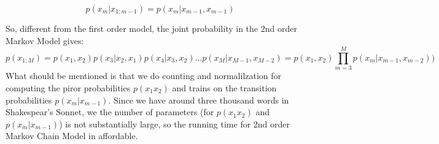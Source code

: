 \begin{equation}
  p(x_m|x_{1:m-1}) = p(x_m|x_{m-1}, x_{m-1})
\end{equation}

So, different from the first order model, the joint probability in the 2nd order Markov Model gives:
\begin{equation}
  p(x_{1:M}) =p(x_1, x_2)p(x_3|x_2, x_1)p(x_4|x_3, x_2) ...  p(x_M|x_{M-1}, x_{M-2}) = p(x_1, x_2) \prod\limits_{m=3}^M p(x_m|x_{m-1}, x_{m-2}))
\end{equation} 
What should be mentioned is that we do counting and normalilzation for computing the piror probabilities $p(x_1 x_2)$ and trains on the transition probabilities $p(x_m|x_{m-1})$. Since we have around three thousand words in Shakespear's Sonnet, we the number of parameters (for $p(x_1 x_2)$ and $p(x_m|x_{m-1})$) is not substantially large, so the running time for 2nd order Markov Chain Model in affordable.
